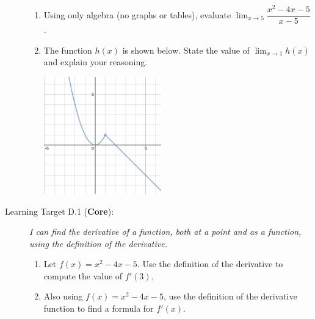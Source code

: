 \documentclass[11 pt]{article}
\begin{document}
\begin{description}
\begin{enumerate}
    \item Using only algebra (no graphs or tables), evaluate $\lim_{x \to 5}\dfrac{x^2 - 4x - 5}{x-5} $.
    \item The function $h(x)$ is shown below. State the value of $\lim_{x \to 1} h(x)$ and explain your reasoning.
    \begin{center}
        \includegraphics[width=2in]{c2p2-sample-l1.png}
    \end{center}
    
\end{enumerate}

\item[Learning Target D.1 (\textbf{Core}):] \textit{I can find the derivative of a function, both at a point and as a function, using the definition of the derivative.}


\begin{enumerate}
    \item Let $f(x) = x^2 - 4x - 5$. Use the definition of the derivative to compute the value of $f'(3)$. 
    \item Also using $f(x) = x^2 - 4x - 5$, use the definition of the derivative function to find a formula for $f'(x)$. 
\end{enumerate}

\end{description}
\end{document}
